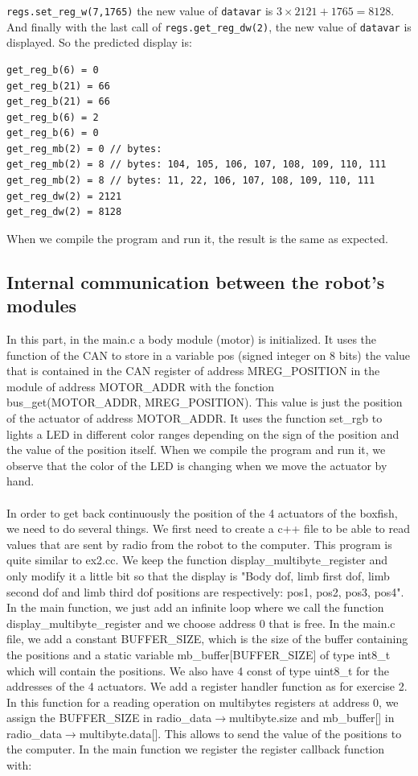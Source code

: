\documentclass[11pt]{article}
\begin{document}
\texttt{regs.set\_reg\_w(7,1765)} the new value of \texttt{datavar} is ${3\times2121 + 1765 = 8128}$. And finally with the last call of \texttt{regs.get\_reg\_dw(2)}, the new value of \texttt{datavar} is displayed. So the predicted display is:


\begin{verbatim}
get_reg_b(6) = 0
get_reg_b(21) = 66
get_reg_b(21) = 66
get_reg_b(6) = 2
get_reg_b(6) = 0
get_reg_mb(2) = 0 // bytes:
get_reg_mb(2) = 8 // bytes: 104, 105, 106, 107, 108, 109, 110, 111
get_reg_mb(2) = 8 // bytes: 11, 22, 106, 107, 108, 109, 110, 111
get_reg_dw(2) = 2121
get_reg_dw(2) = 8128
\end{verbatim}

When we compile the program and run it, the result is the same as expected.

\subsection{Internal communication between the robot's modules}

In this part, in the main.c a body module (motor) is initialized. It uses the function of the CAN to store in a variable pos (signed integer on 8 bits) the value that is contained in the CAN register of address MREG\_POSITION in the module of address MOTOR\_ADDR with the fonction bus\_get(MOTOR\_ADDR, MREG\_POSITION). This value is just the position of the actuator of address MOTOR\_ADDR. It uses the function set\_rgb to lights a LED in different color ranges depending on the sign of the position and the value of the position itself. When we compile the program and run it, we observe that the color of the LED is changing when we move the actuator by hand.
\\
\\
In order to get back continuously the position of the 4 actuators of the boxfish, we need to do several things. We first need to create a c++ file to be able to read values that are sent by radio from the robot to the computer. This program is quite similar to ex2.cc. We keep the function display\_multibyte\_register and only modify it a little bit so that the display is "Body dof, limb first dof, limb second dof and limb third dof positions are respectively: pos1, pos2, pos3, pos4". In the main function, we just add an infinite loop where we call the function display\_multibyte\_register and we choose address 0 that is free. In the main.c file, we add a constant BUFFER\_SIZE, which is the size of the buffer containing the positions and a static variable mb\_buffer[BUFFER\_SIZE] of type int8\_t which will contain the positions. We also have 4 const of type uint8\_t for the addresses of the 4 actuators. We add a register handler function as for exercise 2. In this function for a reading operation on multibytes registers at address 0, we assign the BUFFER\_SIZE in radio\_data${\rightarrow}$multibyte.size and mb\_buffer[] in radio\_data${\rightarrow}$multibyte.data[]. This allows to send the value of the positions to the computer. In the main function we register the register callback function with:
\end{document}
